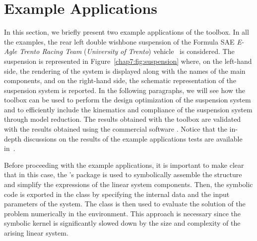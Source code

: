 
\section{Example Applications}
\label{chap7:sec:example_applications}

In this section, we briefly present two example applications of the \TrussMe{} toolbox. In all the examples, the rear left double wishbone suspension of the Formula SAE \emph{E-Agle Trento Racing Team} (\emph{University of Trento}) vehicle~\citep{eagle} is considered. The suspension is represented in Figure~\ref{chap7:fig:suspension} where, on the left-hand side, the rendering of the system is displayed along with the names of the main components, and on the right-hand side, the schematic representation of the suspension system is reported. In the following paragraphs, we will see how the \TrussMe{} toolbox can be used to perform the design optimization of the suspension system and to efficiently include the kinematics and compliance of the suspension system through model reduction. The results obtained with the \TrussMe{} toolbox are validated with the results obtained using the commercial software \Ansys{}. Notice that the in-depth discussions on the results of the example applications tests are available in~\cite{larcher2024symbolic}.

Before proceeding with the example applications, it is important to make clear that in this case, the \TrussMe{}'s package is used to symbolically assemble the structure and simplify the expressions of the linear system components. Then, the symbolic code is exported in the \Matlab{} class by specifying the internal data and the input parameters of the system. The \Matlab{} class is then used to evaluate the solution of the problem numerically in the \Simulink{} environment. This approach is necessary since the symbolic kernel is significantly slowed down by the size and complexity of the arising linear system.

